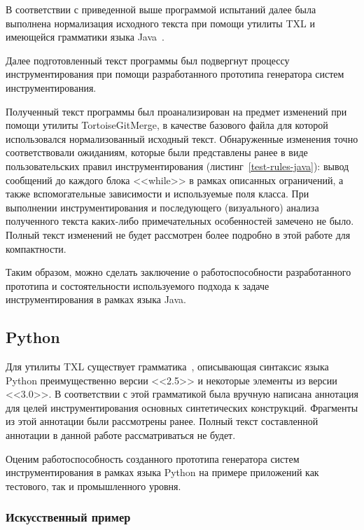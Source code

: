 В соответствии с приведенной выше программой испытаний далее была выполнена нормализация исходного текста при помощи утилиты TXL и имеющейся грамматики языка Java~\cite{txl-resources}.

Далее подготовленный текст программы был подвергнут процессу инструментирования при помощи разработанного прототипа генератора систем инструментирования.

Полученный текст программы был проанализирован на предмет изменений при помощи утилиты TortoiseGitMerge, в качестве базового файла для которой использовался нормализованный исходный текст.
Обнаруженные изменения точно соответствовали ожиданиям, которые были представлены ранее в виде пользовательских правил инструментирования (листинг~\ref{test-rules-java}):
вывод сообщений до каждого блока <<while>> в рамках описанных ограничений,
а также вспомогательные зависимости и используемые поля класса.
При выполнении инструментирования и последующего (визуального) анализа полученного текста каких-либо примечательных особенностей замечено не было.
Полный текст изменений не будет рассмотрен более подробно в этой работе для компактности.

Таким образом, можно сделать заключение о работоспособности разработанного прототипа и состоятельности используемого подхода к задаче инструментирования в рамках языка Java.

\subsection{Python}

Для утилиты TXL существует грамматика~\cite{txl-resources}, описывающая синтаксис языка Python преимущественно версии <<2.5>> и некоторые элементы из версии <<3.0>>.
В соответствии с этой грамматикой была вручную написана аннотация для целей инструментирования основных синтетических конструкций.
Фрагменты из этой аннотации были рассмотрены ранее.
Полный текст составленной аннотации в данной работе рассматриваться не будет.

Оценим работоспособность созданного прототипа генератора систем инструментирования в рамках языка Python на примере приложений как тестового, так и промышленного уровня.

\subsubsection{Искусственный пример}

